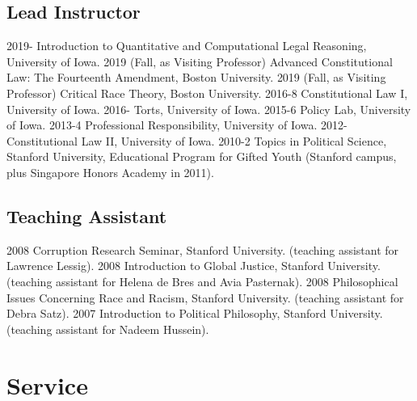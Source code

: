\documentclass[letterpaper]{moderncv}
\begin{document}
\subsection{Lead Instructor}
\cvitem
{2019-}
{Introduction to Quantitative and Computational Legal Reasoning, University of Iowa.}
\vspace{1mm}
\cvitem
{2019 (Fall, as Visiting Professor)}
{Advanced Constitutional Law: The Fourteenth Amendment, Boston University.}
\vspace{1mm}
\cvitem
{2019 (Fall, as Visiting Professor)}
{Critical Race Theory, Boston University.}
\vspace{1mm}
\cvitem
{2016-8}
{Constitutional Law I, University of Iowa.}
\vspace{1mm}
\cvitem
{2016-}
{Torts, University of Iowa.}
\vspace{1mm}
\cvitem
{2015-6}
{Policy Lab, University of Iowa.}
\vspace{1mm}
\cvitem
{2013-4}
{Professional Responsibility, University of Iowa.}
\vspace{1mm}
\cvitem
{2012-}
{Constitutional Law II, University of Iowa.}
\vspace{1mm}
\cvitem
{2010-2}
{Topics in Political Science, Stanford University, Educational Program for Gifted Youth (Stanford campus, plus Singapore Honors Academy in 2011).}
\vspace{1mm}
\subsection{Teaching Assistant}
\cvitem
{2008}
{Corruption Research Seminar, Stanford University.
  \newline
  (teaching assistant for Lawrence Lessig).
}
\vspace{1mm}
\cvitem
{2008}
{Introduction to Global Justice, Stanford University.
  \newline
  (teaching assistant for Helena de Bres and Avia Pasternak).
}
\vspace{1mm}
\cvitem
{2008}
{Philosophical Issues Concerning Race and Racism, Stanford University.
  \newline
  (teaching assistant for Debra Satz).
}
\vspace{1mm}
\cvitem
{2007}
{Introduction to Political Philosophy, Stanford University.
  \newline
  (teaching assistant for Nadeem Hussein).
}
\vspace{1mm}

\section{Service}
\end{document}
